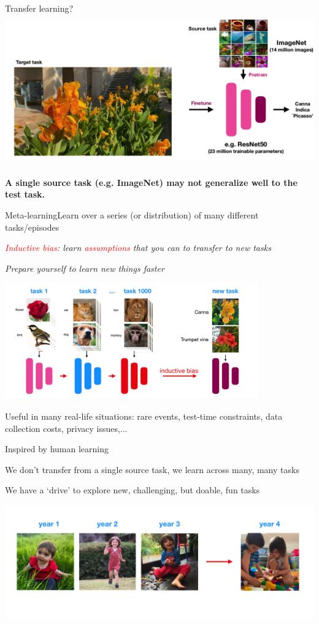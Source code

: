 \documentclass[aspectratio=169,t,handout,xcolor={usenames,dvipsnames}]{beamer}
\begin{document}
\begin{frame}{Transfer learning?}
\includegraphics[height=6.5cm]{image/Jietu20220328-163705.jpg}

\pause
\small\centerline{\textbf{A single source task (e.g. ImageNet) may not generalize well to the test task.}}
\end{frame}

\begin{frame}{Meta-learning}{Learn over a series (or distribution) of many different tasks/episodes}
\centerline{\textit{\textcolor{red}{Inductive bias}: learn \textcolor{red}{assumptions} that you can to transfer to new tasks}}
\centerline{\textit{Prepare yourself to learn new things faster}}
\centering\includegraphics[height=5cm]{image/Jietu20220328-182859.jpg}

\pause
\leavevmode\hphantom{ }

\small\centerline{Useful in many real-life situations: rare events, test-time constraints, data collection costs, privacy issues,...}
\end{frame}

\begin{frame}{Inspired by human learning}
\centerline{We don’t transfer from a single source task, we learn across many, many tasks}
\centerline{We have a ‘drive’ to explore new, challenging, but doable, fun tasks}
 
\centering\includegraphics[height=5cm]{image/Jietu20220328-184210.jpg}

\end{frame}
\end{document}
